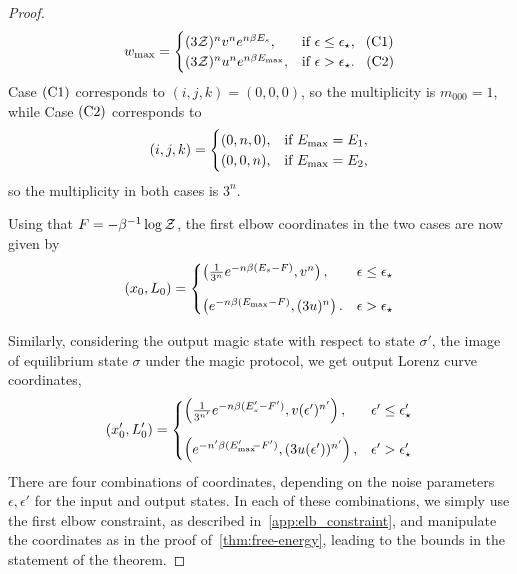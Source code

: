 \documentclass[pra,
aps,
twocolumn,
superscriptaddress,
groupedaddress,
nofootinbib,
reprint
]{revtex4-1}
\begin{document}
\begin{proof}
\begin{equation*}
w_{\rm max} =
	\begin{cases}
		(3\mathcal{Z})^{n} v^n e^{n\beta E_s}, &\mbox{if }\epsilon \leq \epsilon_{\star},\ \hspace{3pt}\rm{(C1)}\\
		(3\mathcal{Z})^{n} u^n e^{n\beta E_{\rm{max}}}, &\mbox{if }\epsilon > \epsilon_{\star}.\ \hspace{5pt}\rm{(C2)} 
	\end{cases}
\end{equation*}
Case $\rm{(C1)}$ corresponds to $(i,j,k) = (0,0,0)$, so the multiplicity is $m_{000} = 1$, while
Case $\rm{(C2)}$ corresponds to
\begin{equation}
	(i,j,k) = 
	\begin{cases}
	(0,n,0), &\text{if } E_{\rm{max}} = E_1, \\
	(0,0,n), &\text{if } E_{\rm{max}} = E_2,
	\end{cases}
\end{equation}
so the multiplicity in both cases is $3^n$.

Using that $F = -\beta^{-1} \log \mathcal{Z}$, the first elbow coordinates in the two cases are now given by
\begin{equation}\label{eq:first_elb_coords}
	(x_0, L_0) =
	\begin{cases}
		\left(\frac{1}{3^n} e^{-n\beta (E_s - F)}, v^n \right), &\epsilon \leq \epsilon_\star \vspace{10pt}\\
		\left( e^{-n\beta (E_{\rm{max}}-F)}, (3u)^n \right). &\epsilon > \epsilon_\star
	\end{cases}
\end{equation}

Similarly, considering the output magic state with respect to state $\sigma'$, the image of equilibrium state $\sigma$ under the magic protocol, we get output Lorenz curve coordinates,
\begin{equation}\label{eq:transformed_first_elb_coords}
	(x'_0, L'_0) =
	\begin{cases}
		\left(\frac{1}{3^{n'}} e^{-n\beta (E'_s - F')}, v(\epsilon')^{n'} \right), &\epsilon' \leq \epsilon'_\star \vspace{10pt}\\
		\left( e^{-n'\beta (E'_{\rm{max}}\hspace{-2.5pt}-F')}, (3u(\epsilon'))^{n'} \right), &\epsilon' > \epsilon'_\star
	\end{cases}
\end{equation}
There are four combinations of coordinates, depending on the noise parameters $\epsilon, \epsilon'$ for the input and output states.
In each of these combinations, we simply use the first elbow constraint, as described in~\cref{app:elb_constraint}, and manipulate the coordinates as in the proof of~\cref{thm:free-energy}, leading to the bounds in the statement of the theorem.
\end{proof}
	
\end{document}
